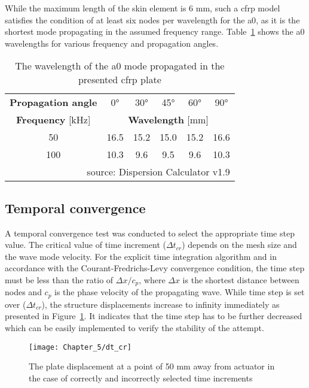 \documentclass[11pt,a4paper,final]{report}
\theoremstyle{plain}
\begin{document}
While the maximum length of the skin element is 6 \unit{\mm}, such a \ac{cfrp} model satisfies the condition of at least six nodes per wavelength for the \ac{a0}, as it is the shortest mode propagating in the assumed frequency range.
Table~\ref{tab:wavelength} shows the \ac{a0} wavelengths for various frequency and propagation angles.
\begin{table}[H]
	\small
	\tabcolsep=0.5cm
	\centering
	\caption{\label{tab:wavelength}The wavelength of the \ac{a0} mode propagated in the presented \ac{cfrp} plate}
	\begin{tabular}{cccccc}
		\toprule
		\textbf{Propagation angle} & \ang{0} & \ang{30} & \ang{45} & \ang{60} & \ang{90}\\
		\textbf{Frequency} [\unit{\kHz}] & \multicolumn{5}{c}{\textbf{Wavelength} [\unit{\mm}]}\\
		\midrule
		50 & 16.5 & 15.2 & 15.0 & 15.2 & 16.6\\
		100 & 10.3 & 9.6 & 9.5 & 9.6 & 10.3\\
		\bottomrule
		\multicolumn{6}{r}{{\scriptsize{source: Dispersion Calculator v1.9}}}
	\end{tabular}
\end{table}
\subsection{Temporal convergence}
A temporal convergence test was conducted to select the appropriate time step value.
The critical value of time increment (\(\Delta t_{cr}\)) depends on the mesh size and the wave mode velocity.
For the explicit time integration algorithm and in accordance with the Courant-Fredrichs-Levy convergence condition, the time step must be less than the ratio of \(\Delta x/c_p\), where \(\Delta x\) is the shortest distance between nodes and \(c_p\) is the phase velocity of the propagating wave.
While time step is set over (\(\Delta t_{cr}\)), the structure displacements increase to infinity immediately as presented in Figure~\ref{fig:dt_cr}.
It indicates that the time step has to be further decreased which can be easily implemented to verify the stability of the attempt.
\begin{figure}[!tbh]
	\begin{center}
		\texttt{[image: Chapter\_5/dt\_cr]}
	\end{center}
	\caption{The plate displacement at a point of 50 mm away from actuator in the case of correctly and incorrectly selected time increments}
	\label{fig:dt_cr}
\end{figure} 
\end{document}
